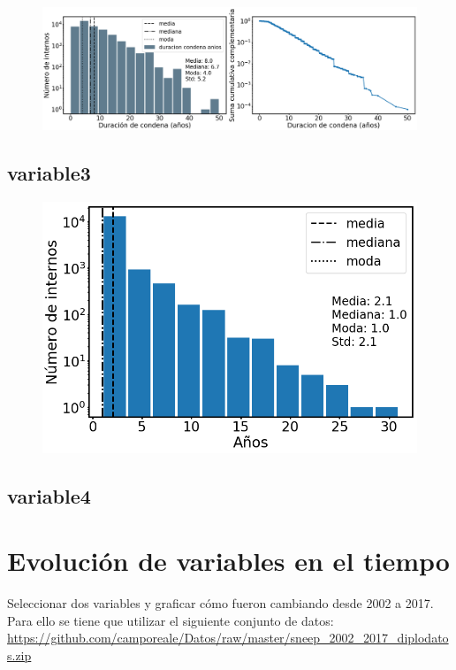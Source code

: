 \documentclass[10pt]{article}
\begin{document}
\begin{figure}[H]
	\centering
	\includegraphics[scale=0.28]{graficos/duracion.png}
	\caption{}
\end{figure}

\subsection{variable3}

\begin{figure}[H]
	\centering
	\includegraphics[scale=0.3]{graficos/diff_condenado_detencion.png}
	\caption{}
\end{figure}

\subsection{variable4}

\section{Evolución de variables en el tiempo}
Seleccionar dos variables y graficar cómo fueron cambiando desde 2002 a 2017. Para ello se tiene que utilizar el siguiente conjunto de datos: \url{https://github.com/camporeale/Datos/raw/master/sneep_2002_2017_diplodatos.zip}\\
\end{document}

